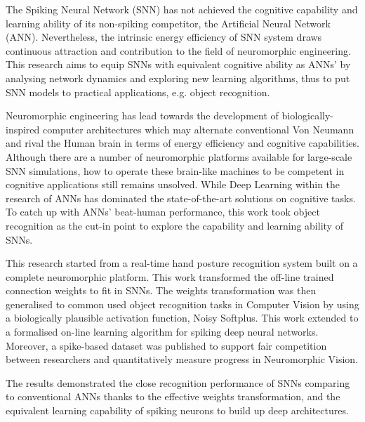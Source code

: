 The Spiking Neural Network (SNN) has not achieved the cognitive capability and learning ability of its non-spiking competitor, the Artificial Neural Network (ANN).
Nevertheless, the intrinsic energy efficiency of SNN system draws continuous attraction and contribution to the field of neuromorphic engineering.
This research aims to equip SNNs with equivalent cognitive ability as ANNs' by analysing network dynamics and exploring new learning algorithms, thus to put SNN models to practical applications, e.g. object recognition.

Neuromorphic engineering has lead towards the development of biologically-inspired computer architectures which may alternate conventional Von Neumann and rival the Human brain in terms of energy efficiency and cognitive capabilities.
Although there are a number of neuromorphic platforms available for large-scale SNN simulations, how to operate these brain-like machines to be competent in cognitive applications still remains unsolved.
While Deep Learning within the research of ANNs has dominated the state-of-the-art solutions on cognitive tasks.
To catch up with ANNs' beat-human performance, this work took object recognition as the cut-in point to explore the capability and learning ability of SNNs.

This research started from a real-time hand posture recognition system built on a complete neuromorphic platform.
This work transformed the off-line trained connection weights to fit in SNNs.
The weights transformation was then generalised to common used object recognition tasks in Computer Vision by using a biologically plausible activation function, Noisy Softplus.
This work extended to a formalised on-line learning algorithm for spiking deep neural networks.
Moreover, a spike-based dataset was published to support fair competition between researchers and quantitatively measure progress in Neuromorphic Vision.

The results demonstrated the close recognition performance of SNNs comparing to conventional ANNs thanks to the effective weights transformation, and the equivalent learning capability of spiking neurons to build up deep architectures.
